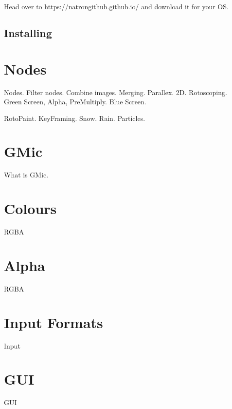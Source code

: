 \documentclass[12pt,oneside,openany,letterpaper]{memoir}
\begin{document}
Head over to https://natrongithub.github.io/ and download it for your OS.



\section{Installing}









\chapter{Nodes}

Nodes. Filter nodes. Combine images. Merging. Parallex. 2D. Rotoscoping. \\
Green Screen, Alpha, PreMultiply. Blue Screen.

RotoPaint. KeyFraming. Snow. Rain. Particles.







\chapter{GMic}
What is GMic.








\chapter{Colours}
RGBA








\chapter{Alpha}
RGBA







\chapter{Input Formats}
Input








\chapter{GUI}
GUI
\end{document}
